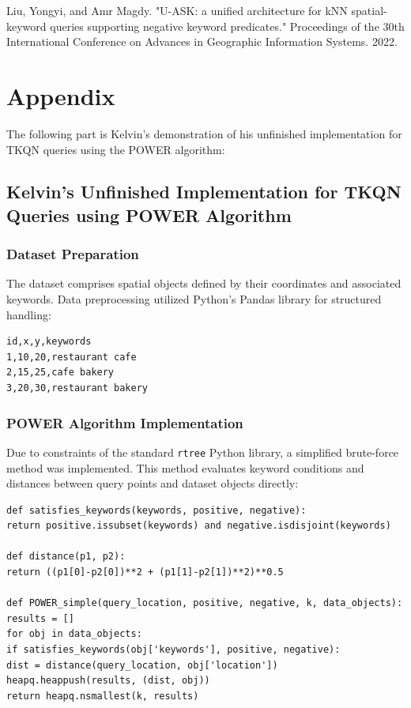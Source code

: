 \documentclass[]{IEEEphot}
\begin{document}
\begin{thebibliography}{10}
     Liu, Yongyi, and Amr Magdy. "U-ASK: a unified architecture for kNN spatial-keyword queries supporting negative keyword predicates." Proceedings of the 30th International Conference on Advances in Geographic Information Systems. 2022.
\end{thebibliography}

\section*{Appendix}

The following part is Kelvin's demonstration of his unfinished implementation for TKQN queries using the POWER algorithm:

\subsection*{Kelvin's Unfinished Implementation for TKQN Queries using POWER Algorithm}

\subsubsection*{Dataset Preparation}
The dataset comprises spatial objects defined by their coordinates  and associated keywords. Data preprocessing utilized Python's Pandas library for structured handling:

\begin{verbatim}
id,x,y,keywords
1,10,20,restaurant cafe
2,15,25,cafe bakery
3,20,30,restaurant bakery
\end{verbatim}

\subsubsection*{POWER Algorithm Implementation}
Due to constraints of the standard \texttt{rtree} Python library, a simplified brute-force method was implemented. This method evaluates keyword conditions and distances between query points and dataset objects directly:

\begin{verbatim}
def satisfies_keywords(keywords, positive, negative):
return positive.issubset(keywords) and negative.isdisjoint(keywords)

def distance(p1, p2):
return ((p1[0]-p2[0])**2 + (p1[1]-p2[1])**2)**0.5

def POWER_simple(query_location, positive, negative, k, data_objects):
results = []
for obj in data_objects:
if satisfies_keywords(obj['keywords'], positive, negative):
dist = distance(query_location, obj['location'])
heapq.heappush(results, (dist, obj))
return heapq.nsmallest(k, results)
\end{verbatim}
\end{document}

